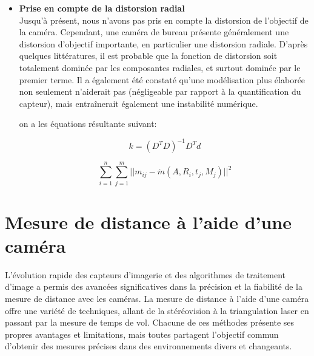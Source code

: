 \begin{itemize}[label={\Huge$\star$}]
 \item \textbf{Prise en compte de la distorsion radial}
 \\
 
 Jusqu’à présent, nous n’avons pas pris en compte la distorsion de l’objectif de la caméra. Cependant, une caméra de bureau présente généralement une distorsion d'objectif importante, en particulier une distorsion radiale. 
  D'après quelques littératures, il est probable que la fonction de distorsion soit totalement dominée par les composantes radiales, et surtout dominée par le premier terme. Il a également été constaté qu'une modélisation plus élaborée non seulement n'aiderait pas (négligeable par rapport à la quantification du capteur), mais entraînerait également une instabilité numérique.
  
 on a les équations résultante suivant:
 
 \begin{equation}
 	k
 	=
 	(D^{T}D)^{-1}D^{T}d
 	\label{eq:radial}
 \end{equation}	
 	
 	\begin{equation}
 		\sum_{i=1}^{n} \sum_{j=1}^{m} 
 		||m_{ij}-\mathring{m}
 		(A,R_{i},t_{j},M_{j})||^{2}
 		\label{eq:radial2}
 	\end{equation}
 	
 \end{itemize} 
 
 
 



\section{Mesure de distance à l'aide d'une caméra}

   
L'évolution rapide des capteurs d'imagerie et des algorithmes de traitement d'image a permis des avancées significatives dans la précision et la fiabilité de la mesure de distance avec les caméras. 
La mesure de distance à l'aide d'une caméra offre une variété de techniques, allant de la stéréovision à la triangulation laser en passant par la mesure de temps de vol. Chacune de ces méthodes présente ses propres avantages et limitations, mais toutes partagent l'objectif commun d'obtenir des mesures précises dans des environnements divers et changeants.


